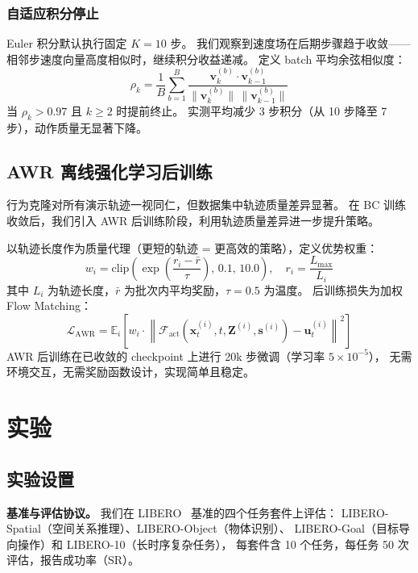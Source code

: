\documentclass[10pt,twocolumn]{ctexart}
\begin{document}
\subsubsection{自适应积分停止}

Euler 积分默认执行固定 $K=10$ 步。
我们观察到速度场在后期步骤趋于收敛——相邻步速度向量高度相似时，继续积分收益递减。
定义 batch 平均余弦相似度：
\begin{equation}
    \rho_k = \frac{1}{B}\sum_{b=1}^B \frac{\mathbf{v}_k^{(b)} \cdot \mathbf{v}_{k-1}^{(b)}}{\|\mathbf{v}_k^{(b)}\|\,\|\mathbf{v}_{k-1}^{(b)}\|}
\end{equation}
当 $\rho_k > 0.97$ 且 $k \ge 2$ 时提前终止。
实测平均减少 3 步积分（从 10 步降至 7 步），动作质量无显著下降。

\subsection{AWR 离线强化学习后训练}\label{sec:awr}

行为克隆对所有演示轨迹一视同仁，但数据集中轨迹质量差异显著。
在 BC 训练收敛后，我们引入 AWR 后训练阶段，利用轨迹质量差异进一步提升策略。

以轨迹长度作为质量代理（更短的轨迹 = 更高效的策略），定义优势权重：
\begin{equation}
    w_i = \text{clip}\!\left(\exp\!\left(\frac{r_i - \bar{r}}{\tau}\right),\, 0.1,\, 10.0\right), \quad r_i = \frac{L_\text{max}}{L_i}
\end{equation}
其中 $L_i$ 为轨迹长度，$\bar{r}$ 为批次内平均奖励，$\tau=0.5$ 为温度。
后训练损失为加权 Flow Matching：
\begin{equation}
    \mathcal{L}_\text{AWR} = \mathbb{E}_i\!\left[w_i \cdot \left\|\mathcal{F}_\text{act}(\mathbf{x}_t^{(i)}, t, \mathbf{Z}^{(i)}, \mathbf{s}^{(i)}) - \mathbf{u}_t^{(i)}\right\|^2\right]
\end{equation}
AWR 后训练在已收敛的 checkpoint 上进行 20k 步微调（学习率 $5\times10^{-5}$），
无需环境交互，无需奖励函数设计，实现简单且稳定。

\section{实验}

\subsection{实验设置}

\textbf{基准与评估协议。}
我们在 LIBERO~\cite{liu2023libero} 基准的四个任务套件上评估：
LIBERO-Spatial（空间关系推理）、LIBERO-Object（物体识别）、
LIBERO-Goal（目标导向操作）和 LIBERO-10（长时序复杂任务），
每套件含 10 个任务，每任务 50 次评估，报告成功率（SR）。
\end{document}
